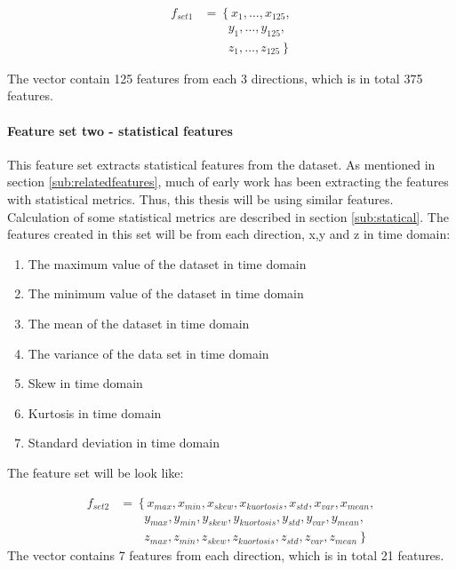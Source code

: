 \documentclass[USenglish]{ifimaster}  %
\begin{document}
\begin{align}\label{eq:f1}
f_{set1} &= \left\{ x_1,\dotsc,x_{125}, \right.\nonumber\\
&\qquad \left. {} y_1, \dotsc,y_{125}, \right.\nonumber\\
&\qquad \left. {} z_1,\dotsc,z_{125} \right\}
\end{align}


The vector contain 125 features from each 3 directions, which is in total 375 features.
	

		
		
	
\paragraph{Feature set two - statistical features} 
This feature set extracts statistical features from the dataset. As mentioned in section \ref{sub:relatedfeatures}, much of early work has been extracting the features with statistical metrics. Thus, this thesis will be using similar features. Calculation of some statistical metrics are described in section \ref{sub:statical}. The features created in this set will be from each direction, x,y and z in time domain: 
	
	
	\begin{enumerate}
		\item The maximum value of the dataset in time domain
		\item The minimum value of the dataset in time domain
		\item The mean of the dataset in time domain
		\item The variance of the data set in time domain
		\item Skew in time domain
		\item Kurtosis in time domain 
		\item Standard deviation in time domain
	\end{enumerate}
	
The feature set will be look like:
	
\begin{align}
	f_{set2} &= \left\{ x_{max},x_{min},x_{skew},x_{kuortosis},x_{std},x_{var},x_{mean}, \right.\nonumber\\
	&\qquad \left. {} y_{max},y_{min},y_{skew},y_{kuortosis},y_{std},y_{var},y_{mean}, \right.\nonumber\\
	&\qquad \left. {} z_{max},z_{min},z_{skew},z_{kuortosis},z_{std},z_{var},z_{mean} \right\}
\end{align}
The vector contains 7 features from each direction, which is in total 21 features. 
	
\end{document}
